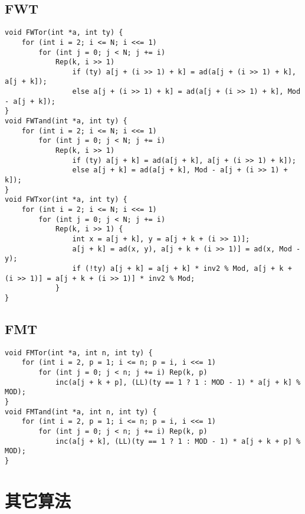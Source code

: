 \documentclass[twocolumn,a4]{article}
\begin{document}
\subsection{FWT}
\begin{lstlisting}
void FWTor(int *a, int ty) {
	for (int i = 2; i <= N; i <<= 1)
		for (int j = 0; j < N; j += i)
			Rep(k, i >> 1)
				if (ty) a[j + (i >> 1) + k] = ad(a[j + (i >> 1) + k], a[j + k]);
				else a[j + (i >> 1) + k] = ad(a[j + (i >> 1) + k], Mod - a[j + k]);
}
void FWTand(int *a, int ty) {
	for (int i = 2; i <= N; i <<= 1)
		for (int j = 0; j < N; j += i)
			Rep(k, i >> 1)
				if (ty) a[j + k] = ad(a[j + k], a[j + (i >> 1) + k]);
				else a[j + k] = ad(a[j + k], Mod - a[j + (i >> 1) + k]);
}
void FWTxor(int *a, int ty) {
	for (int i = 2; i <= N; i <<= 1)
		for (int j = 0; j < N; j += i)
			Rep(k, i >> 1) {
				int x = a[j + k], y = a[j + k + (i >> 1)];
				a[j + k] = ad(x, y), a[j + k + (i >> 1)] = ad(x, Mod - y);
				if (!ty) a[j + k] = a[j + k] * inv2 % Mod, a[j + k + (i >> 1)] = a[j + k + (i >> 1)] * inv2 % Mod;
			}
}
\end{lstlisting}
\subsection{FMT}
\begin{lstlisting}
void FMTor(int *a, int n, int ty) {
	for (int i = 2, p = 1; i <= n; p = i, i <<= 1)
		for (int j = 0; j < n; j += i) Rep(k, p)
			inc(a[j + k + p], (LL)(ty == 1 ? 1 : MOD - 1) * a[j + k] % MOD);
}
void FMTand(int *a, int n, int ty) {
	for (int i = 2, p = 1; i <= n; p = i, i <<= 1)
		for (int j = 0; j < n; j += i) Rep(k, p)
			inc(a[j + k], (LL)(ty == 1 ? 1 : MOD - 1) * a[j + k + p] % MOD);
}
\end{lstlisting}

\section{其它算法}
\end{document}
